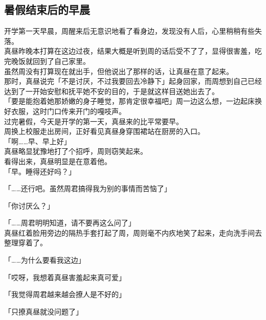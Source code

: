 \subsection{暑假结束后的早晨}

开学第一天早晨，周醒来后无意识地看了看身边，发现没有人后，心里稍稍有些失落。\\

真昼昨晚本打算在这边过夜，结果大概是听到周的话后受不了了，显得很害羞，吃完晚饭就回到了自己家里。\\

虽然周没有打算现在就出手，但他说出了那样的话，让真昼在意了起来。\\

那时，真昼说完「不是讨厌，不过我要回去冷静下」起身回家，而周想到自己已经达到了一开始安慰和抚平她不安的目的，于是就这样目送她出去了。\\

「要是能抱着她那娇嫩的身子睡觉，那肯定很幸福吧」周一边这么想，一边起床换好衣服，这时门口传来开门的嘎吱声。\\

过完暑假，今天是开学的第一天，真昼来的比平常要早。\\

周换上校服走出房间，正好看见真昼身穿围裙站在厨房的入口。\\

「啊……早、早上好」\\

真昼略显犹豫地打了个招呼，周则窃笑起来。\\

看得出来，真昼明显是在意着他。\\

「早。睡得还好吗？」

「……还行吧。虽然周君搞得我为别的事情而苦恼了」

「你讨厌么？」

「……周君明明知道，请不要再这么问了」\\

真昼红着脸用旁边的隔热手套打起了周，周则毫不内疚地笑了起来，走向洗手间去整理穿着了。\\

\vspace{2\baselineskip}

「……为什么要看我这边」

「哎呀，我想着真昼害羞起来真可爱」

「我觉得周君越来越会撩人是不好的」

「只撩真昼就没问题了」\\

